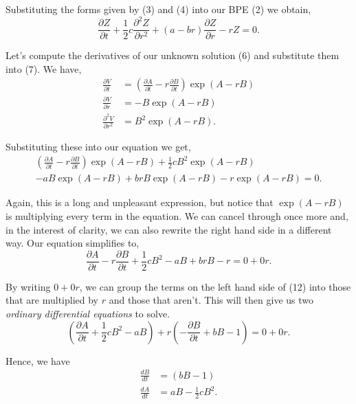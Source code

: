 \documentclass[11pt]{article}
\begin{document}
Substituting the forms given by (3) and (4) into our BPE (2) we obtain,
\begin{equation}
    \frac{\partial Z}{\partial t} + \frac{1}{2} c \frac{\partial^2 Z}{\partial r^2} + (a - b r) \frac{\partial Z}{\partial r} - rZ = 0.
\end{equation}

Let's compute the derivatives of our unknown solution (6) and substitute them into (7). We have,
\begin{align}
    \frac{\partial V}{\partial t} &= \left( \frac{\partial A}{\partial t} - r \frac{\partial B}{\partial t} \right) \exp ( A - rB) \\
    \frac{\partial V}{\partial r} &= -B \exp (A - rB) \\
    \frac{\partial^2 V}{\partial r^2} &= B^2 \exp (A-rB).
\end{align}

Substituting these into our equation we get,
\begin{multline}
    \left( \frac{\partial A}{\partial t} - r \frac{\partial B}{\partial t} \right) \exp ( A - rB) + \frac{1}{2} c B^2 \exp (A-rB) \\ - a B \exp (A - rB) + b r B \exp (A - rB) - r \exp (A - rB) = 0.
\end{multline}

Again, this is a long and unpleasant expression, but notice that $\exp (A - rB)$ is multiplying every term in the equation. We can cancel through once more and, in the interest of clarity, we can also rewrite the right hand side in a different way. Our equation simplifies to,
\begin{equation}
    \frac{\partial A}{\partial t} - r \frac{\partial B}{\partial t}  + \frac{1}{2} c B^2 - a B + b r B - r = 0 + 0r.
\end{equation}

By writing $0 + 0r$, we can group the terms on the left hand side of (12) into those that are multiplied by $r$ and those that aren't. This will then give us two \textit{ordinary differential equations} to solve.
\begin{equation}
    \left( \frac{\partial A}{\partial t} + \frac{1}{2} c B^2 - a B \right) + r \left( -\frac{\partial B}{\partial t}  + b B - 1 \right) = 0 + 0r. 
\end{equation}

Hence, we have
\begin{align}
    \frac{dB}{dt} &= (bB - 1) \\
    \frac{dA}{dt} &= a B - \frac{1}{2} c B^2.
\end{align}
\end{document}
